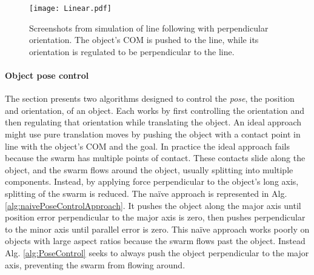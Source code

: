\begin{figure*}
\centering

\texttt{[image: Linear.pdf]}
\vspace{0em}
\caption{\label{fig:LinearScreenShots}
Screenshots from simulation of line following with perpendicular orientation.
 The object's COM is pushed to the line, while its orientation is regulated to be perpendicular to the line.
}
\end{figure*}








\paragraph{Object pose control}
The section presents two algorithms designed to control the \emph{pose}, the position and orientation, of an object.  
Each works by first controlling the orientation and then regulating that orientation while translating the object. 
An ideal approach might use pure translation moves by  pushing  the object with a contact point in line with the object's COM and the goal.
In practice the ideal approach fails because the swarm has multiple points of contact. These contacts slide along the object, and the swarm flows around the object, usually splitting into multiple components.
Instead, by applying force perpendicular to the object's long axis, splitting of the swarm is reduced. 
The na\"{i}ve approach is represented in Alg. \ref{alg:naivePoseControlApproach}.  It pushes the object along the major axis until position error perpendicular to the major axis is zero, then pushes perpendicular to the minor axis until parallel error is zero. 
This na\"{i}ve approach works poorly on objects with large aspect ratios because the swarm flows past the object. 
Instead Alg. \ref{alg:PoseControl} seeks to always push the object perpendicular to the major axis, preventing the swarm from flowing around. 


